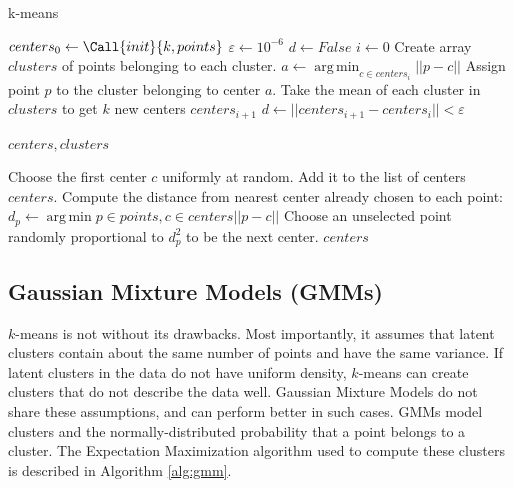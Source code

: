 \documentclass[11pt]{amsart}
\DeclareMathOperator*{\argmin}{arg\,min}
\begin{document}
\begin{algorithm}[!ht]
\caption{k-means}\label{alg:k-means}
\begin{algorithmic}
    \State \(centers_0 \gets \Call{init}{k, points}\)
    \State \(\varepsilon \gets 10^{-6}\) 
    \State \(d \gets False\) 
    \State \(i \gets 0\) 
        \State Create array \(clusters\) of points belonging to each cluster.
            \State \(a \gets \argmin_{c \in centers_i} ||p - c||\) 
            \State Assign point \(p\) to the cluster belonging to center \(a\).
        \EndFor
        \State Take the mean of each cluster in \(clusters\) to get \(k\) new centers \(centers_{i+1}\)
        \State \(d \gets ||centers_{i+1} - centers_{i}|| < \varepsilon\)
        
    \EndWhile
    \Return \(centers, clusters\)
    \EndProcedure

        \State {}
        \State Choose the first center \(c\) uniformly at random. Add it to the list of centers \(centers\).
        \State Compute the distance from nearest center already chosen to each point:
        \Statex \(d_p \gets \argmin{p\in points, c\in centers}||p - c||\)
        \State Choose an unselected point randomly proportional to \(d_p^2\) to be the next center.
        \EndWhile
        \Return \(centers\)
    \EndProcedure
\end{algorithmic}
\end{algorithm}

\subsection*{Gaussian Mixture Models (GMMs)} \label{sec:gmms}

\(k\)-means is not without its drawbacks. Most importantly, it assumes that latent clusters contain about the same number of points and have the same variance. If latent clusters in the data do not have uniform density, \(k\)-means can create clusters that do not describe the data well. Gaussian Mixture Models do not share these assumptions, and can perform better in such cases. GMMs model clusters and the normally-distributed probability that a point belongs to a cluster. The Expectation Maximization algorithm used to compute these clusters is described in Algorithm \ref{alg:gmm}.
\end{document}
